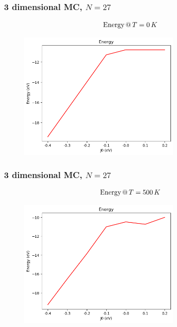 \documentclass{beamer}
\begin{document}
\begin{frame}
    \frametitle{3 dimensional MC, $N=27$}

    $$\textup{Energy}\,@\,T=0\,K$$

    \begin{figure}
        \includegraphics[width=0.7\textwidth]{images/denergy0k.png}
    \end{figure}

\end{frame}

\begin{frame}
    \frametitle{3 dimensional MC, $N=27$}

    $$\textup{Energy}\,@\, T=500\,K$$

    \begin{figure}
        \includegraphics[width=0.7\textwidth]{images/denergy500K.png}
    \end{figure}

\end{frame}
\end{document}
